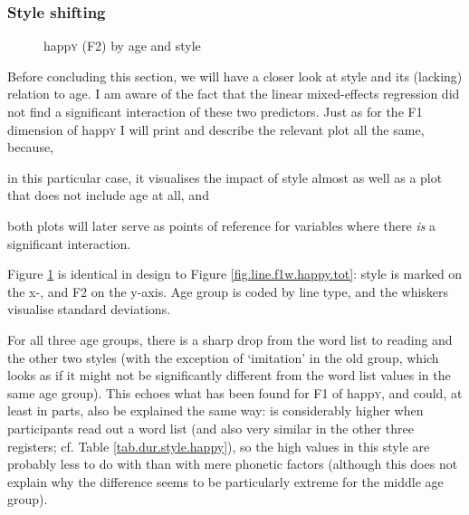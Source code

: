 \subsubsection{Style shifting}
\label{sec.prod.res.vow.happy.f2.shifting}

\begin{figure}[h!]
	\centering
		\resizebox{.5\linewidth}{!}{} 
	\caption{happ\textsc{y} (F2) by age and style}
	\label{fig.line.f2w.happy.tot}
\end{figure}

Before concluding this section, we will have a closer look at style and its (lacking) relation to age.
I am aware of the fact that the linear mixed-effects regression did not find a significant interaction of these two predictors.
Just as for the F1 dimension of happ\textsc{y} I will print and describe the relevant plot all the same, because,
\begin{inparaenum}[(a)]
	\item in this particular case, it visualises the impact of style almost as well as a plot that does not include age at all, and
	\item both plots will later serve as points of reference for variables where there \emph{is} a significant interaction.
\end{inparaenum}
Figure \ref{fig.line.f2w.happy.tot} is identical in design to Figure \ref{fig.line.f1w.happy.tot}: style is marked on the x-, and F2 on the y-axis.
Age group is coded by line type, and the whiskers visualise standard deviations.

For all three age groups, there is a sharp drop from the word list to reading and the other two styles (with the exception of `imitation' in the old group, which looks as if it might not be significantly different from the word list values in the same age group).
This echoes what has been found for F1 of happ\textsc{y}, and could, at least in parts, also be explained the same way:  is considerably higher when participants read out a word list (and also very similar in the other three registers; cf. Table \ref{tab.dur.style.happy}), so the high values in this style are probably less to do with  than with mere phonetic factors (although this does not explain why the difference seems to be particularly extreme for the middle age group).

